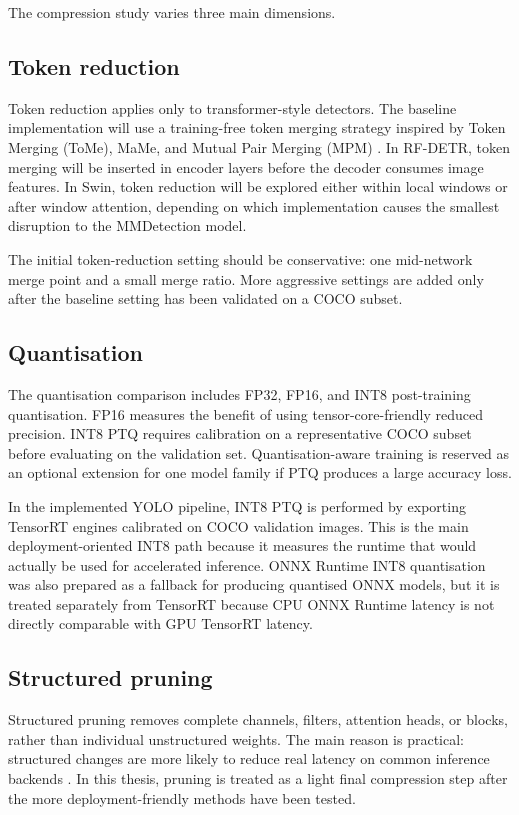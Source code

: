 \documentclass[a4paper,11pt,twoside]{report}
\theoremstyle{definition}
\begin{document}
The compression study varies three main dimensions.

\subsection{Token reduction}

Token reduction applies only to transformer-style detectors. The baseline implementation will use a training-free token merging strategy inspired by Token Merging (ToMe), MaMe, and Mutual Pair Merging (MPM) \cite{Bolya2023ToMe, MaMe2026, MPM2026}. In RF-DETR, token merging will be inserted in encoder layers before the decoder consumes image features. In Swin, token reduction will be explored either within local windows or after window attention, depending on which implementation causes the smallest disruption to the MMDetection model.

The initial token-reduction setting should be conservative: one mid-network merge point and a small merge ratio. More aggressive settings are added only after the baseline setting has been validated on a COCO subset.

\subsection{Quantisation}

The quantisation comparison includes FP32, FP16, and INT8 post-training quantisation. FP16 measures the benefit of using tensor-core-friendly reduced precision. INT8 PTQ requires calibration on a representative COCO subset before evaluating on the validation set. Quantisation-aware training is reserved as an optional extension for one model family if PTQ produces a large accuracy loss.

In the implemented YOLO pipeline, INT8 PTQ is performed by exporting TensorRT engines calibrated on COCO validation images. This is the main deployment-oriented INT8 path because it measures the runtime that would actually be used for accelerated inference. ONNX Runtime INT8 quantisation was also prepared as a fallback for producing quantised ONNX models, but it is treated separately from TensorRT because CPU ONNX Runtime latency is not directly comparable with GPU TensorRT latency.

\subsection{Structured pruning}

Structured pruning removes complete channels, filters, attention heads, or blocks, rather than individual unstructured weights. The main reason is practical: structured changes are more likely to reduce real latency on common inference backends \cite{Li2017PruningFilters}. In this thesis, pruning is treated as a light final compression step after the more deployment-friendly methods have been tested.
\end{document}
